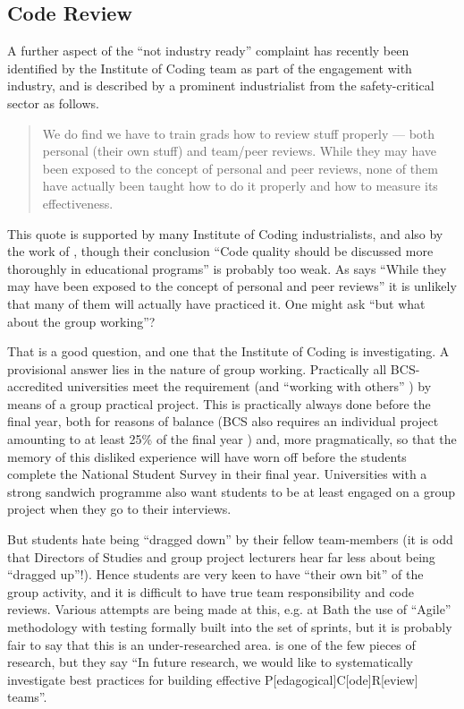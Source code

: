 \documentclass[sigconf]{acmart}
\begin{document}
\subsection{Code Review}\label{sec:Code}
A further aspect of the ``not industry ready'' complaint has recently been identified by the Institute of Coding team as part of the engagement with industry, and is described by a prominent industrialist from the safety-critical sector as follows. 
\begin{quote}
We do find we have to train grads how to review stuff properly --- both personal (their own stuff) and team/peer reviews. While they may have been exposed to the concept of personal and peer reviews, none of them have actually been taught how to do it properly and how to measure its effectiveness. \cite{Chapman2018c}
\end{quote}
This quote is supported by many Institute of Coding industrialists, and also by the work of  \cite{Boerstleretal2018a}, though their conclusion ``Code quality should be discussed more thoroughly in educational programs'' is probably too weak. As \cite{Chapman2018c} says ``While they may have been exposed to the concept of personal and peer reviews'' it is unlikely that many of them will actually have practiced it.  One might ask ``but what about the group working''? 
\par
That is a good question, and one that the Institute of Coding is investigating. A provisional answer lies in the nature of group working. Practically all BCS-accredited universities meet the requirement \cite[Requirement 2.3.1]{BCS2018a} (and ``working with others'' \cite[Requirement 2.3.2]{BCS2018a}) by means of a group practical project. This is practically always done before the final year, both for reasons of balance (BCS also requires an individual project amounting to at least 25\% of the final year \cite[Requirement 2.5.1]{BCS2018a}) and, more pragmatically, so that the memory of this disliked experience will have worn off before the students complete the National Student Survey in their final year. Universities with a strong sandwich programme also want students to be at least engaged on a group project when they go to their interviews.

But students hate being ``dragged down'' by their fellow team-members (it is odd that Directors of Studies and group project lecturers hear far less about being ``dragged up''!).  Hence students are very keen to have ``their own bit'' of the group activity, and it is difficult to have true team responsibility and code reviews.  Various attempts are being made at this, e.g. at Bath the use of ``Agile'' methodology with testing formally built into the  set of sprints, but it is probably fair to say that this is an under-researched area.  \cite{Hundhausenetal2013a} is one of the few pieces of research, but they say ``In future research, we would like to systematically investigate best practices for building effective P[edagogical]C[ode]R[eview] teams''. 
\fi
\end{document}
